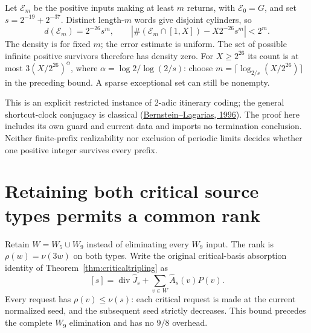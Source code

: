 \documentclass[11pt]{article}
\begin{document}
Let $\mathcal E_m$ be the positive inputs making at least $m$ returns,
with $\mathcal E_0=G$, and set $s=2^{-19}+2^{-37}$.
Distinct length-$m$ words give disjoint cylinders, so
\[
 d(\mathcal E_m)=2^{-26}s^m,\qquad
 \left|\#(\mathcal E_m\cap[1,X])-X2^{-26}s^m\right|<2^m.
\]
The density is for fixed $m$; the error estimate is uniform.
The set of possible infinite positive survivors therefore has density zero.
For $X\ge2^{26}$ its count is at most
$3(X/2^{26})^\alpha$, where
$\alpha=\log2/\log(2/s)$: choose
$m=\lceil\log_{2/s}(X/2^{26})\rceil$ in the preceding bound.
A sparse exceptional set can still be nonempty.

This is an explicit restricted instance of 2-adic itinerary coding;
the general shortcut-clock conjugacy is classical
(\href{https://doi.org/10.4153/CJM-1996-060-x}{Bernstein--Lagarias, 1996}).
The proof here includes its own guard and current data and imports no
termination conclusion. Neither finite-prefix realizability nor exclusion
of periodic limits decides whether one positive integer survives every prefix.

\section{Retaining both critical source types permits a common rank}
Retain $W=W_5\cup W_9$ instead of eliminating every $W_9$ input.
The rank is $\rho(w)=\nu(3w)$ on both types. Write the original
critical-basis absorption identity of Theorem~\ref{thm:criticaltripling}
as
\[
 [s]=\operatorname{div}\widehat J_s+
       \sum_{v\in W}\widehat A_s(v)P(v).
\]
Every request has $\rho(v)\le\nu(s)$: each critical request is made
at the current normalized seed, and the subsequent seed strictly decreases.
This bound precedes the complete $W_9$ elimination and has no $9/8$ overhead.
\end{document}
